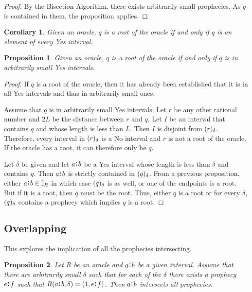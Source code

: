 \documentclass[12pt]{article}
\newtheorem{corollary}{Corollary}[section]
\newtheorem{proposition}{Proposition}[section]
\begin{document}
\begin{proof}
    By the Bisection Algorithm, there exists arbitrarily small prophecies. As $q$ is contained in them, the proposition applies. 
\end{proof}



\begin{corollary}
    Given an oracle, $q$ is a root of the oracle if and only if $q$ is an element of every Yes interval. 
\end{corollary}

\begin{proposition}
    Given an oracle, $q$ is a root of the oracle if and only if $q$ is in arbitrarily small Yes intervals. 
\end{proposition}

\begin{proof}
   If $q$ is a root of the oracle, then it has already been established that it is in all Yes intervals and thus in arbitrarily small ones. 
   
   Assume that $q$ is in arbitrarily small Yes intervals. Let $r$ be any other rational number and $2L$ be the distance between $r$ and $q$. Let $I$ be an interval that contains $q$ and whose length is less than $L$. Then $I$ is disjoint from $(r)_{\delta}$. Therefore, every interval in $(r)_{\delta}$ is a No interval and $r$ is not a root of the oracle. If the oracle has a root, it can therefore only be $q$. 
   
    Let $\delta$ be given and let $a\rint b$ be a Yes interval whose length is less than $\delta$ and contains $q$. Then $a\rint b$ is strictly contained in $(q)_{\delta}$. From a previous proposition, either $a\rint b \in \mathbb{I}_R$ in which case $(q)_{\delta}$ is as well, or one of the endpoints is a root. But if it is a root, then $q$ must be the root. Thus, either $q$ is a root or for every $\delta$, $(q)_{\delta}$ contains a prophecy which implies $q$ is a root. 
\end{proof}


\subsection{Overlapping}


This explores the implication of all the prophecies intersecting. 

\begin{proposition}
    Let $R$ be an oracle and $a\rint b$ be a given interval. Assume that there are arbitrarily small $\delta$ such that for each of the $\delta$ there exists a prophecy $e\rint f$ such that $R(a \rint b, \delta) = (1, e\rint f)$. Then $a\rint b$ intersects all prophecies. 
\end{proposition}
\end{document}
